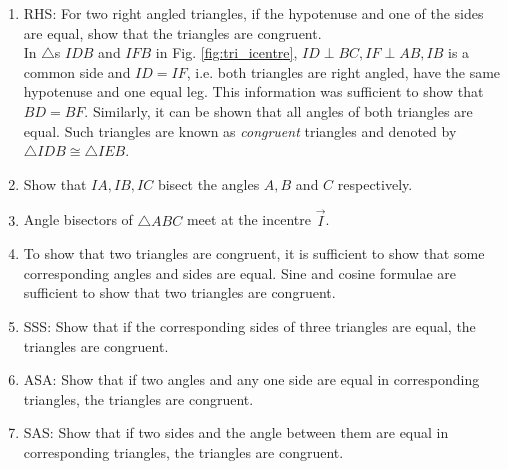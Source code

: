 \renewcommand{\theequation}{\theenumi}
\begin{enumerate}[label=\arabic*.,ref=\thesubsection.\theenumi]

\item
RHS:	For two right angled triangles, if the hypotenuse and one of the sides are equal, show that the triangles are congruent.
\\
\solution In $\triangle$s $IDB$ and $IFB$ in  Fig. \ref{fig:tri_icentre},  $ID\perp BC, IF\perp AB, IB$ is a common side and $ID = IF$, i.e. both triangles are right angled, have the same hypotenuse and one equal leg.  This information was sufficient to show that $BD = BF$.  Similarly, it can be shown that all angles of both triangles are equal.  Such triangles are known as {\em congruent} triangles and denoted by $\triangle IDB \cong \triangle IEB$.
\item Show that $IA, IB, IC$ bisect the angles $A, B$ and $C$ respectively.  
\item Angle bisectors of $\triangle ABC$ meet at the incentre $\vec{I}$.

\item
To show that two triangles are congruent, it is sufficient to show that some corresponding angles and sides are equal.  Sine and cosine formulae are sufficient to show that two triangles are congruent.



\item
SSS:	Show that if the corresponding sides of three triangles are equal, the triangles are congruent.

\item
ASA:	Show that if two angles and any one side  are equal in corresponding triangles, the triangles are congruent.

\item
SAS:	Show that if two sides and the angle between them are equal in corresponding triangles, the triangles are congruent.%

\end{enumerate}

